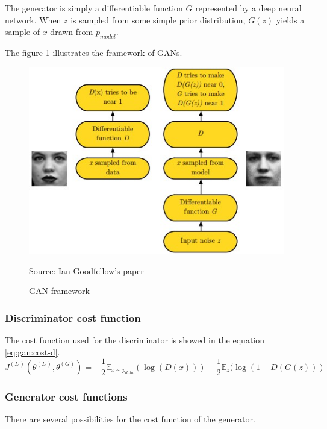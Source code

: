 \documentclass[12pt]{report}
\begin{document}
The generator is simply a differentiable function $G$ represented by a deep neural network.
When $z$ is sampled from some simple prior distribution, $G(z)$ yields a sample of $x$ drawn from $p_{model}$.

The figure \ref{fig:gan-framework} illustrates the framework of GANs.

\begin{figure}
    \centering
    \includegraphics[width=\textwidth]{images/nn/architectures/gan-framework.jpg}
    \caption{GAN framework}
    \label{fig:gan-framework}
    Source: Ian Goodfellow's paper \cite{goodfellow_nips_2017}
\end{figure}

\subsubsection{Discriminator cost function}

The cost function used for the discriminator is showed in the equation \ref{eq:gan:cost-d}.
\begin{equation}
    J^{(D)}(\theta^{(D)}, \theta^{(G)}) = -\frac{1}{2}\mathbb{E}_{x \sim p_{data}} (\log (D(x))) - \frac{1}{2} \mathbb{E}_{z} ( \log (1 -D(G(z)))
    \label{eq:gan:cost-d}
\end{equation}

\subsubsection{Generator cost functions}

There are several possibilities for the cost function of the generator.
\end{document}
